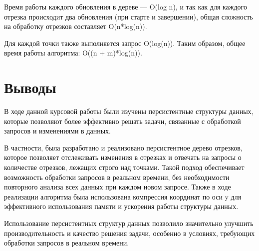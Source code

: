 \documentclass[12pt]{article}
\begin{document}
Время работы каждого обновления в дереве — O(log n), и так как для каждого отрезка происходит два обновления (при старте и завершении), общая сложность на обработку отрезков составляет O(n*log(n)).

Для каждой точки также выполняется запрос O(log(n)). Таким образом, общее время работы алгоритма: O((n + m)*log(n)).

\newpage
\section*{Выводы}

В ходе данной курсовой работы были изучены персистентные структуры данных, которые позволяют более эффективно решать задачи, связанные с обработкой запросов и изменениями в данных. 

В частности, была разработано и реализовано персистентное дерево отрезков, которое позволяет отслеживать изменения в отрезках и отвечать на запросы о количестве отрезков, лежащих строго над точками. Такой подход обеспечивает возможность обработки запросов в реальном времени, без необходимости повторного анализа всех данных при каждом новом запросе. Также в ходе реализации алгоритма была использована компрессия координат по оси y для эффективного использования памяти и ускорения работы структуры данных.

Использование персистентных структур данных позволило значительно улучшить производительность и качество решения задачи, особенно в условиях, требующих обработки запросов в реальном времени.
\end{document}
